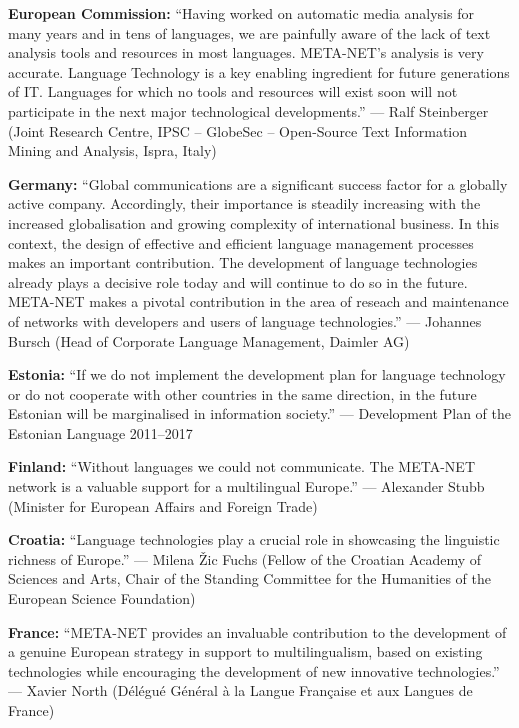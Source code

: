 \documentclass[10pt, plain]{../../metanetpaper}
\begin{document}
\medskip \textbf{European Commission:} ``Having worked on automatic media analysis for many years and in tens of languages, we are painfully aware of the lack of text analysis tools and resources in most languages. META-NET's analysis is very accurate. Language Technology is a key enabling ingredient for future generations of IT. Languages for which no tools and resources will exist soon will not participate in the next major technological developments.'' --- Ralf Steinberger (Joint Research Centre, 
IPSC -- GlobeSec -- Open-Source Text Information Mining and Analysis, Ispra, Italy)

\medskip \textbf{Germany:} ``Global communications are a significant success factor for a globally active company. Accordingly, their importance is steadily increasing with the increased globalisation and growing complexity of international business. In this context, the design of effective and efficient language management processes makes an important contribution. The development of language technologies already plays a decisive role today and will continue to do so in the future. META-NET makes a pivotal contribution in the area of reseach and maintenance of networks with developers and users of language technologies.'' ---
Johannes Bursch (Head of Corporate Language Management, Daimler AG)

\medskip \textbf{Estonia:} ``If we do not implement the development plan for language technology or do not cooperate with other countries in the same direction, in the future Estonian will be marginalised in information society.'' --- Development Plan of the Estonian Language 2011--2017

\medskip \textbf{Finland:} ``Without languages we could not communicate. The META-NET network is a valuable support for a multilingual Europe.'' --- Alexander Stubb (Minister for European Affairs and Foreign Trade)

\medskip \textbf{Croatia:} ``Language technologies play a crucial role in showcasing the linguistic richness of Europe.'' --- Milena Žic Fuchs (Fellow of the Croatian Academy of Sciences and Arts, Chair of the Standing Committee for the Humanities of the European Science Foundation)

\medskip \textbf{France:} ``META-NET provides an invaluable contribution to the development of a genuine European strategy in support to multilingualism, based on existing technologies while encouraging the development of new innovative technologies.'' --- Xavier North (Délégué Général à la Langue Française et aux Langues de France)
\end{document}
